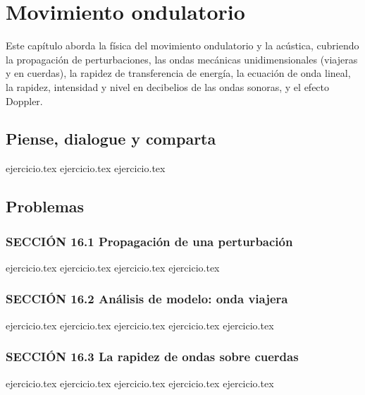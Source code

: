 \chapter{Movimiento ondulatorio}
\label{cap:movimiento_ondulatorio}

Este capítulo aborda la física del movimiento ondulatorio y la acústica, cubriendo la propagación de perturbaciones, las ondas mecánicas unidimensionales (viajeras y en cuerdas), la rapidez de transferencia de energía, la ecuación de onda lineal, la rapidez, intensidad y nivel en decibelios de las ondas sonoras, y el efecto Doppler.

\section*{Piense, dialogue y comparta}
\begin{enumerate}
    {ejercicio.tex}
    {ejercicio.tex}
    {ejercicio.tex}
\end{enumerate}

\section*{Problemas}

\subsection*{SECCIÓN 16.1 Propagación de una perturbación}
\begin{enumerate}
    {ejercicio.tex}
    {ejercicio.tex}
    {ejercicio.tex}
    {ejercicio.tex}
\end{enumerate}

\subsection*{SECCIÓN 16.2 Análisis de modelo: onda viajera}
\begin{enumerate}
    \setcounter{enumi}{4}
    {ejercicio.tex}
    {ejercicio.tex}
    {ejercicio.tex}
    {ejercicio.tex}
    {ejercicio.tex}
\end{enumerate}

\subsection*{SECCIÓN 16.3 La rapidez de ondas sobre cuerdas}
\begin{enumerate}
    \setcounter{enumi}{9}
    {ejercicio.tex}
    {ejercicio.tex}
    {ejercicio.tex}
    {ejercicio.tex}
    {ejercicio.tex}
\end{enumerate}

